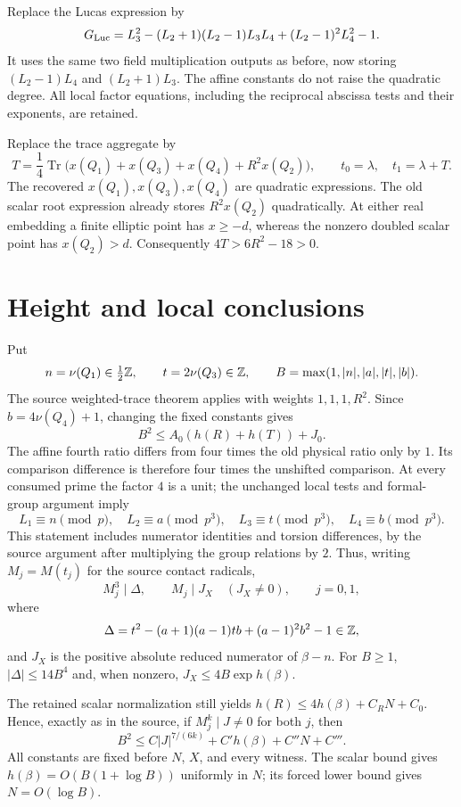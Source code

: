 \documentclass[11pt]{article}
\DeclareMathOperator{\Tr}{Tr}
\begin{document}
Replace the Lucas expression by
\[
 G_{\rm Luc}=L_3^2-(L_2+1)(L_2-1)L_3L_4+(L_2-1)^2L_4^2-1.
\]
It uses the same two field multiplication outputs as before, now storing
$(L_2-1)L_4$ and $(L_2+1)L_3$. The affine constants do not raise the
quadratic degree. All local factor equations, including the reciprocal
abscissa tests and their exponents, are retained.

Replace the trace aggregate by
\[
 T=\frac14\Tr\bigl(x(Q_1)+x(Q_3)+x(Q_4)+R^2x(Q_2)\bigr),
 \qquad t_0=\lambda,\quad t_1=\lambda+T.
\]
The recovered $x(Q_1),x(Q_3),x(Q_4)$ are quadratic expressions. The old
scalar root expression already stores $R^2x(Q_2)$ quadratically.
At either real embedding a finite elliptic point has $x\ge-d$, whereas
the nonzero doubled scalar point has $x(Q_2)>d$. Consequently
$4T>6R^2-18>0$.

\section*{Height and local conclusions}
Put
\[
 n=\nu(Q_1)\in\tfrac12\mathbb Z,\qquad t=2\nu(Q_3)\in\mathbb Z,
 \qquad B=\max(1,|n|,|a|,|t|,|b|).
\]
The source weighted-trace theorem applies with weights $1,1,1,R^2$.
Since $b=4\nu(Q_4)+1$, changing the fixed constants gives
\[
                 B^2\le A_0(h(R)+h(T))+J_0.
\]
The affine fourth ratio differs from four times the old physical ratio
only by $1$. Its comparison difference is therefore four times the
unshifted comparison. At every consumed prime the factor $4$ is a unit;
the unchanged local tests and formal-group argument imply
\[
 L_1\equiv n\pmod p,\quad L_2\equiv a\pmod{p^3},\quad
 L_3\equiv t\pmod{p^3},\quad L_4\equiv b\pmod{p^3}.
\]
This statement includes numerator identities and torsion differences,
by the source argument after multiplying the group relations by $2$.
Thus, writing $M_j=M(t_j)$ for the source contact radicals,
\[
 M_j^3\mid\Delta,\qquad M_j\mid J_X\quad(J_X\ne0),\qquad j=0,1,
\]
where
\[
 \Delta=t^2-(a+1)(a-1)tb+(a-1)^2b^2-1\in\mathbb Z,
\]
and $J_X$ is the positive absolute reduced numerator of $\beta-n$.
For $B\ge1$, $|\Delta|\le14B^4$ and, when nonzero,
$J_X\le4B\exp h(\beta)$.

The retained scalar normalization still yields
$h(R)\le4h(\beta)+C_RN+C_0$. Hence, exactly as in the source, if
$M_j^k\mid J\ne0$ for both $j$, then
\[
 B^2\le C|J|^{7/(6k)}+C'h(\beta)+C''N+C'''.
\]
All constants are fixed before $N$, $X$, and every witness. The scalar
bound gives $h(\beta)=O(B(1+\log B))$ uniformly in $N$; its forced
lower bound gives $N=O(\log B)$.
\end{document}
